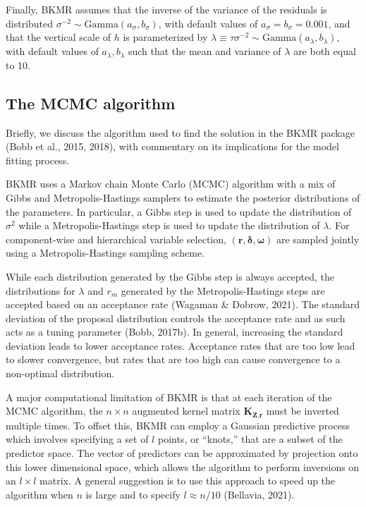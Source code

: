 \documentclass[12pt, twoside]{amherstthesis}
\begin{document}
Finally, BKMR assumes that the inverse of the variance of the residuals is distributed \(\sigma^{-2} \sim \text{Gamma}(a_\sigma, b_\sigma)\), with default values of \(a_\sigma=b_\sigma=0.001\), and that the vertical scale of \(h\) is parameterized by \(\lambda \equiv \tau\sigma^{-2} \sim \text{Gamma}(a_\lambda, b_\lambda)\), with default values of \(a_\lambda, b_\lambda\) such that the mean and variance of \(\lambda\) are both equal to 10.

\hypertarget{the-mcmc-algorithm}{%
\subsection{The MCMC algorithm}\label{the-mcmc-algorithm}}

Briefly, we discuss the algorithm used to find the solution in the BKMR package (Bobb et al., 2015, 2018), with commentary on its implications for the model fitting process.

BKMR uses a Markov chain Monte Carlo (MCMC) algorithm with a mix of Gibbs and Metropolis-Hastings samplers to estimate the posterior distributions of the parameters. In particular, a Gibbs step is used to update the distribution of \(\sigma^2\) while a Metropolis-Hastings step is used to update the distribution of \(\lambda\). For component-wise and hierarchical variable selection, \((\textbf{r}, \boldsymbol\delta, \boldsymbol\omega)\) are sampled jointly using a Metropolis-Hastings sampling scheme.

While each distribution generated by the Gibbs step is always accepted, the distributions for \(\lambda\) and \(r_m\) generated by the Metropolis-Hastings steps are accepted based on an acceptance rate (Wagaman \& Dobrow, 2021). The standard deviation of the proposal distribution controls the acceptance rate and as such acts as a tuning parameter (Bobb, 2017b). In general, increasing the standard deviation leads to lower acceptance rates. Acceptance rates that are too low lead to slower convergence, but rates that are too high can cause convergence to a non-optimal distribution.

A major computational limitation of BKMR is that at each iteration of the MCMC algorithm, the \(n \times n\) augmented kernel matrix \(\textbf{K}_{\textbf{Z},\textbf{r}}\) must be inverted multiple times. To offset this, BKMR can employ a Gaussian predictive process which involves specifying a set of \(l\) points, or ``knots,'' that are a subset of the predictor space. The vector of predictors can be approximated by projection onto this lower dimensional space, which allows the algorithm to perform inversions on an \(l\times l\) matrix. A general suggestion is to use this approach to speed up the algorithm when \(n\) is large and to specify \(l\approx n/10\) (Bellavia, 2021).
\end{document}
